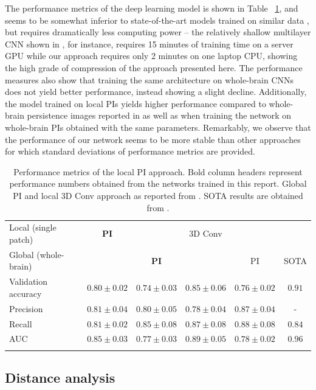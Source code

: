 \documentclass{article}
\begin{document}
The performance metrics of the deep learning model is shown in Table ~\ref{tab:performance}, and
seems to be somewhat inferior to state-of-the-art models trained on similar data
\citep{wen2020convolutional}, but requires dramatically less computing power -- the relatively
shallow multilayer CNN shown in \citet{bruningk2020image}, for instance, requires 15 minutes of
training time on a server GPU while our approach requires only 2 minutes on one laptop CPU, showing
the high grade of compression of the approach presented here. The performance measures also show
that training the same architecture on whole-brain CNNs does not yield better performance, instead
showing a slight decline. Additionally, the model trained on local PIs yields higher performance
compared to whole-brain persistence images reported in \citep{bruningk2020image} as well as when
training the network on whole-brain PIs obtained with the same parameters. Remarkably, we observe
that the performance of our network seems to be more stable than other approaches for which standard
deviations of performance metrics are provided.

\begin{table}
  \centering
  \begin{tabular}{lccccc}
    \toprule
    Local (single patch) & \textbf{PI} & & 3D Conv & & \\
    Global (whole-brain) &&\textbf{PI}& & PI & SOTA \\ \midrule Validation
    accuracy & $0.80\pm 0.02$ & $0.74\pm 0.03$ & $0.85\pm 0.06$ & $ 0.76\pm 0.02$ & $0.91$\\
    Precision & $0.81\pm 0.04$ & $0.80\pm0.05$ &  $0.78\pm 0.04$ & $0.87\pm0.04$ & - \\
    Recall & $0.81\pm 0.02$ & $0.85\pm0.08$ & $0.87\pm0.08$ & $0.88\pm 0.08$ &$0.84$\\
    AUC & $0.85\pm 0.03$ & $0.77\pm0.03$ & $0.89\pm0.05$ & $ 0.78\pm 0.02$ & $0.96$\\
    \bottomrule
    \vspace{1pt}
  \end{tabular}
  \caption{Performance metrics of the local PI approach. Bold column headers represent performance
    numbers obtained from the networks trained in this report. Global PI and local 3D Conv approach as reported from
    \citet{bruningk2020image}. SOTA results are obtained from \citet{liu2018anatomical}.}
  \label{tab:performance}
\end{table}

\subsection{Distance analysis}
\end{document}
